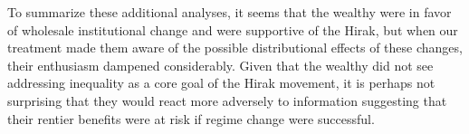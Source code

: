\documentclass[12pt, letterpaper]{article}
\begin{document}
To summarize these additional analyses, it seems that the wealthy were in favor of wholesale institutional change and were supportive of the Hirak, but when our treatment made them aware of the possible distributional effects of these changes, their enthusiasm dampened considerably. Given that the wealthy did not see addressing inequality as a core goal of the Hirak movement, it is perhaps not surprising that they would react more adversely to information suggesting that their rentier benefits were at risk if regime change were successful.



\end{document}
